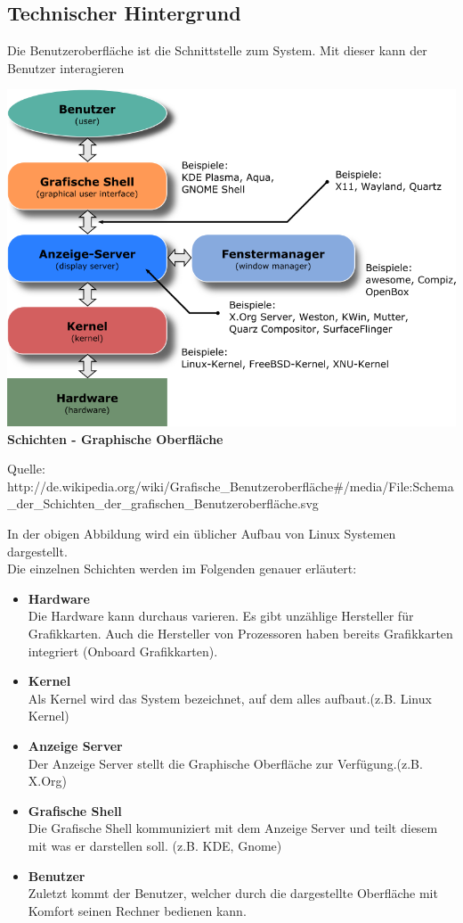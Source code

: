\documentclass[12pt,a4paper]{report}
\begin{document}
\begin{onehalfspace}
\subsection{Technischer Hintergrund}
Die Benutzeroberfläche ist die Schnittstelle zum System. Mit dieser kann der Benutzer interagieren
\begin{center}
\includegraphics[scale=0.7]{../docs/lyaton/graphics/Graph.png}\\
\textbf{Schichten - Graphische Oberfläche}\\
\begin{scriptsize}
Quelle: http://de.wikipedia.org/wiki/Grafische\_Benutzeroberfläche\#/media/File:Schema\_der\_Schichten\_der\_grafischen\_Benutzeroberfläche.svg
\end{scriptsize}
\end{center}
In der obigen Abbildung wird ein üblicher Aufbau von Linux Systemen dargestellt.\\
Die einzelnen Schichten werden im Folgenden genauer erläutert: \\
\begin{itemize}
\item \textbf{Hardware}\\
Die Hardware kann durchaus varieren. Es gibt unzählige Hersteller für Grafikkarten. Auch die Hersteller von Prozessoren haben bereits Grafikkarten integriert (Onboard Grafikkarten). 
\item \textbf{Kernel}\\
Als Kernel wird das System bezeichnet, auf dem alles aufbaut.(z.B. Linux Kernel)
\item \textbf{Anzeige Server}\\
Der Anzeige Server stellt die Graphische Oberfläche zur Verfügung.(z.B. X.Org)
\item \textbf{Grafische Shell}\\
Die Grafische Shell kommuniziert mit dem Anzeige Server und teilt diesem mit was er darstellen soll. (z.B. KDE, Gnome) 
\item \textbf{Benutzer}\\
Zuletzt kommt der Benutzer, welcher durch die dargestellte Oberfläche mit Komfort seinen Rechner bedienen kann. 
\end{itemize}

\end{onehalfspace}
\end{document}
